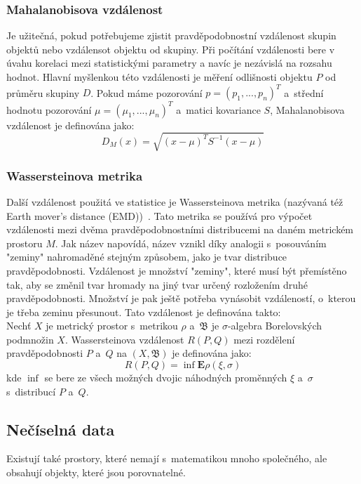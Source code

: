 \subsubsection{Mahalanobisova vzdálenost}
Je užitečná, pokud potřebujeme zjistit pravděpodobnostní vzdálenost skupin objektů nebo vzdálensot objektu od skupiny. Při počítání vzdálenosti bere v úvahu korelaci mezi statistickými parametry a navíc je nezávislá na rozsahu hodnot. Hlavní myšlenkou této vzdálenosti je měření odlišnosti objektu $P$ od průměru skupiny $D$.
Pokud máme pozorování $p = (p_1,..., p_n)^T$ a~střední hodnotu pozorování $\mu=(\mu_1,...,\mu_n)^T $ a~matici kovariance $S$, Mahalanobisova vzdálenost je definována jako:
$$D_M(x) = \sqrt{(x - \mu)^T S^{-1} (x-\mu)}$$

\subsubsection{Wassersteinova metrika}
Další vzdálenost použitá ve statistice je Wassersteinova metrika (nazývaná též Earth mover's distance (EMD))~\cite{Vallender73}. Tato metrika se používá pro výpočet vzdá\-le\-nos\-ti mezi dvěma pravděpodobnostními distribucemi na daném metrickém prostoru $M$. Jak název napovídá, název vznikl díky analogii s~posouváním "zeminy" nahromaděné stejným způsobem, jako je tvar distribuce pravděpodobnosti. Vzdálenost je množství "zeminy", které musí být přemístěno tak, aby se změnil tvar hromady na jiný tvar určený rozložením druhé pravděpodobnosti. Množství je pak ještě potřeba vynásobit vzdáleností, o~kterou je třeba zeminu přesunout. Tato vzdálenost je definována takto: \\
Nechť $X$ je metrický prostor s~metrikou $\rho$ a~$\mathfrak {B}$ je $\sigma$-algebra Borelovských podmnožin $X$. Wassersteinova vzdálenost $R(P, Q)$ mezi rozdělení pravděpodobnosti $P$ a~$Q$ na $(X, \mathfrak{B}) $ je definována jako:
$$R(P,Q)=\inf\mathbf{E}\rho(\xi, \sigma)$$
kde $\inf$ se bere  ze všech možných dvojic náhodných proměnných $\xi$ a~$\sigma$ s~distribucí $P$ a~$Q$.\\

\subsection{Nečíselná data}
Existují také prostory, které nemají s~matematikou mnoho společného, ale obsahují objekty, které jsou porovnatelné.

